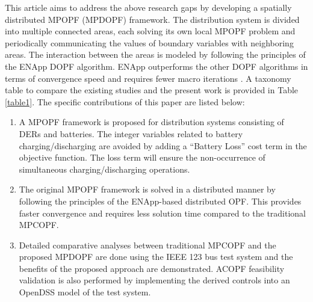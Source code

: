 \documentclass{article}
\begin{document}
This article aims to address the above research gaps by developing a spatially distributed MPOPF (MPDOPF) framework. The distribution system is divided into multiple connected areas, each solving its own local MPOPF problem and periodically communicating the values of boundary variables with neighboring areas. The interaction between the areas is modeled by following the principles of the ENApp DOPF algorithm. ENApp outperforms the other DOPF algorithms in terms of convergence speed and requires fewer macro iterations \cite{Sadnan}. A taxonomy table to compare the existing studies and the present work is provided in Table \ref{table1}. The specific contributions of this paper are listed below:
\begin{enumerate}
    \item A MPOPF framework is proposed for distribution systems consisting of DERs and batteries. The integer variables related to battery charging/discharging are avoided by adding a ``Battery Loss'' cost term in the objective function. The loss term will ensure the non-occurrence of simultaneous charging/discharging operations.
    \item The original MPOPF framework is solved in a distributed manner by following the principles of the ENApp-based distributed OPF. This provides faster convergence and requires less solution time compared to the traditional MPCOPF.
    \item Detailed comparative analyses between traditional MPCOPF and the proposed MPDOPF are done using the IEEE 123 bus test system and the benefits of the proposed approach are demonstrated. ACOPF feasibility validation is also performed by implementing the derived controls into an OpenDSS model of the test system.
\end{enumerate}
\end{document}
